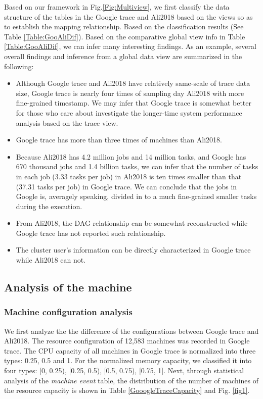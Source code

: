 \documentclass[conference]{IEEEtran}
\begin{document}
Based on our framework in Fig.\ref{Fig:Multiview}, we first classify the data structure of the tables in the Google trace and Ali2018 based on the views so as to establish the mapping relationship. Based on the classification results (See Table \ref{Table:GooAliDif}). Based on the comparative global view info in Table \ref{Table:GooAliDif}, we can infer many interesting findings. As an example, several overall findings and inference from a global data view are summarized in the following:

\begin{itemize}
  \item Although Google trace and Ali2018 have relatively same-scale of trace data size, Google trace  is nearly four times of sampling day Ali2018 with more fine-grained timestamp. We may infer that Google trace is somewhat better for those who care about investigate the longer-time system performance analysis based on the trace view.
    \item Google trace has more than three times of machines than Ali2018.
  \item  Because  Ali2018 has 4.2 million jobs and 14 million tasks, and Google has 670 thousand jobs and 1.4 billion tasks, we can infer that the number of tasks in each job (3.33 tasks per job) in Ali2018 is ten times smaller than that (37.31 tasks per job) in Google trace. We can conclude that the jobs in Google is, averagely speaking, divided in to a much fine-grained smaller tasks during the execution.
  \item From Ali2018,  the DAG relationship can be somewhat reconstructed while Google trace has not reported such relationship.
  \item The cluster user's information can  be directly characterized in Google trace  while  Ali2018 can not.
\end{itemize}


\subsection{Analysis of the machine}\label{Sec:Analymachine}

\subsubsection{Machine configuration analysis}
We first analyze the the difference of the configurations between Google trace and Ali2018.
The resource configuration of 12,583 machines was recorded in Google trace. The CPU capacity of all machines in Google trace is normalized into three types: 0.25, 0.5 and 1. For the normalized memory capacity, we classified it into four types: [0, 0.25), [0.25, 0.5), [0.5, 0.75), [0.75, 1]. Next, through statistical analysis of the \emph{machine event} table, the distribution of the number of machines of the resource capacity is shown in Table \ref{GooogleTraceCapacity} and Fig. \ref{fig1}.
\end{document}
